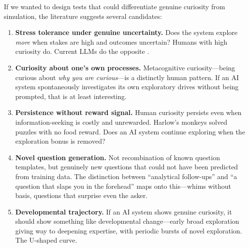 If we wanted to design tests that could differentiate genuine curiosity from simulation, the literature suggests several candidates:

\begin{enumerate}[leftmargin=*]
  \item \textbf{Stress tolerance under genuine uncertainty.} Does the system explore \emph{more} when stakes are high and outcomes uncertain? Humans with high curiosity do. Current LLMs do the opposite \citep{wang2025}.

  \item \textbf{Curiosity about one's own processes.} Metacognitive curiosity---being curious about \emph{why you are curious}---is a distinctly human pattern. If an AI system spontaneously investigates its own exploratory drives without being prompted, that is at least interesting.

  \item \textbf{Persistence without reward signal.} Human curiosity persists even when information-seeking is costly and unrewarded. Harlow's monkeys solved puzzles with no food reward. Does an AI system continue exploring when the exploration bonus is removed?

  \item \textbf{Novel question generation.} Not recombination of known question templates, but genuinely new questions that could not have been predicted from training data. The distinction between ``analytical follow-ups'' and ``a question that slaps you in the forehead'' maps onto this---whims without basis, questions that surprise even the asker.

  \item \textbf{Developmental trajectory.} If an AI system shows genuine curiosity, it should show something like developmental change---early broad exploration giving way to deepening expertise, with periodic bursts of novel exploration. The U-shaped curve.
\end{enumerate}
